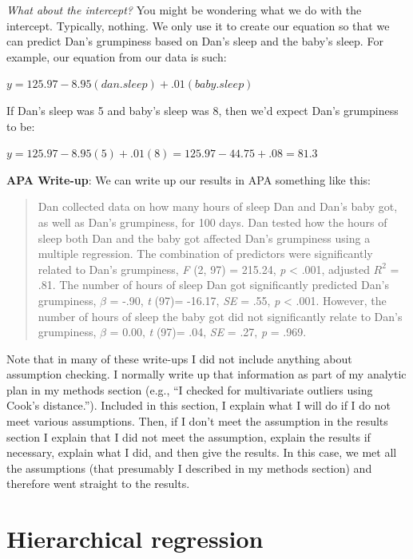 \documentclass[
]{book}
\begin{document}
\emph{What about the intercept?} You might be wondering what we do with the intercept. Typically, nothing. We only use it to create our equation so that we can predict Dan's grumpiness based on Dan's sleep and the baby's sleep. For example, our equation from our data is such:

\(y = 125.97 - 8.95(dan.sleep) + .01(baby.sleep)\)

If Dan's sleep was 5 and baby's sleep was 8, then we'd expect Dan's grumpiness to be:

\(y = 125.97 - 8.95(5) + .01(8) = 125.97 - 44.75 + .08 = 81.3\)

\textbf{APA Write-up}: We can write up our results in APA something like this:

\begin{quote}
Dan collected data on how many hours of sleep Dan and Dan's baby got, as well as Dan's grumpiness, for 100 days. Dan tested how the hours of sleep both Dan and the baby got affected Dan's grumpiness using a multiple regression. The combination of predictors were significantly related to Dan's grumpiness, \emph{F} (2, 97) = 215.24, \emph{p} \textless{} .001, adjusted \(R^2\) = .81. The number of hours of sleep Dan got significantly predicted Dan's grumpiness, \(\beta\) = -.90, \emph{t} (97)= -16.17, \emph{SE} = .55, \emph{p} \textless{} .001. However, the number of hours of sleep the baby got did not significantly relate to Dan's grumpiness, \(\beta\) = 0.00, \emph{t} (97)= .04, \emph{SE} = .27, \emph{p} = .969.
\end{quote}

Note that in many of these write-ups I did not include anything about assumption checking. I normally write up that information as part of my analytic plan in my methods section (e.g., ``I checked for multivariate outliers using Cook's distance.''). Included in this section, I explain what I will do if I do not meet various assumptions. Then, if I don't meet the assumption in the results section I explain that I did not meet the assumption, explain the results if necessary, explain what I did, and then give the results. In this case, we met all the assumptions (that presumably I described in my methods section) and therefore went straight to the results.

\hypertarget{hierarchical-regression}{%
\section{Hierarchical regression}\label{hierarchical-regression}}
\end{document}
